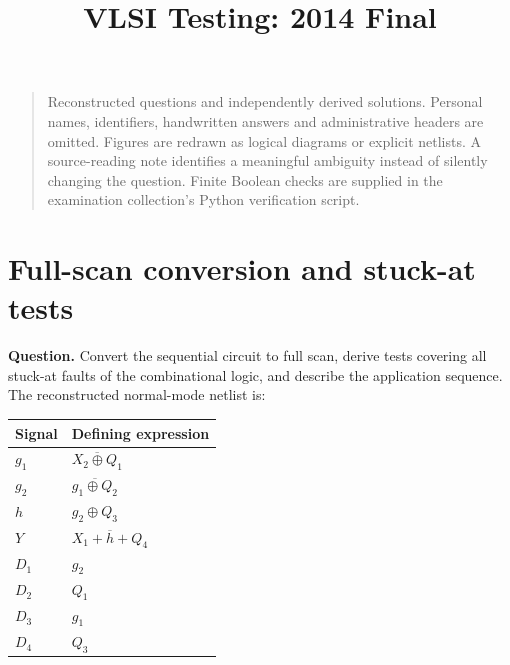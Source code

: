 \documentclass[11pt]{article}
\begin{document}
\title{VLSI Testing: 2014 Final}\author{}\date{}\maketitle\begin{quote}\small
Reconstructed questions and independently derived solutions. Personal names, identifiers,
handwritten answers and administrative headers are omitted. Figures are redrawn as
logical diagrams or explicit netlists. A source-reading note identifies a meaningful
ambiguity instead of silently changing the question. Finite Boolean checks
are supplied in the examination collection's Python verification script.
\end{quote}

\section{Full-scan conversion and stuck-at tests}
\textbf{Question.} Convert the sequential circuit to full scan, derive tests
covering all stuck-at faults of the combinational logic, and describe the
application sequence. The reconstructed normal-mode netlist is:
\begin{center}\begin{tabular}{ll}\toprule Signal & Defining expression\\\midrule
$g_1$ & $\overline{X_2\oplus Q_1}$\\
$g_2$ & $\overline{g_1\oplus Q_2}$\\
$h$ & $g_2\oplus Q_3$\\
$Y$ & $\overline{X_1+h+Q_4}$\\
$D_1$ & $g_2$\\
$D_2$ & $Q_1$\\
$D_3$ & $g_1$\\
$D_4$ & $Q_3$\\
\bottomrule\end{tabular}\end{center}
\begin{center}\end{center}
\end{document}
